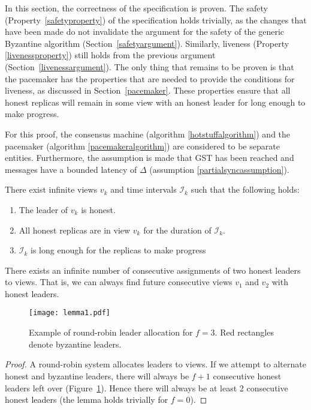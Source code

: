 In this section, the correctness of the specification is proven. The safety (Property~\ref{safetyproperty}) of the specification holds trivially, as the changes that have been made do not invalidate the argument for the safety of the generic Byzantine algorithm (Section~\ref{safetyargument}). Similarly, liveness (Property \ref{livenessproperty}) still holds from the previous argument (Section~\ref{livenessargument}). The only thing that remains to be proven is that the pacemaker has the properties that are needed to provide the conditions for liveness, as discussed in Section~\ref{pacemaker}. These properties ensure that all honest replicas will remain in some view with an honest leader for long enough to make progress.

For this proof, the consensus machine (algorithm \ref{hotstuffalgorithm}) and the pacemaker (algorithm \ref{pacemakeralgorithm}) are considered to be separate entities. Furthermore, the assumption is made that GST has been reached and messages have a bounded latency of $\Delta$ (assumption \ref{partialsyncassumption}).

\begin{theorem} \label{viewsync}
	There exist infinite views $v_k$ and time intervals $\mathcal{I}_k$ such that the following holds:
	\begin{enumerate}
		\item The leader of $v_k$ is honest.
		\item All honest replicas are in view $v_k$ for the duration of $\mathcal{I}_k$.
		\item $\mathcal{I}_k$ is long enough for the replicas to make progress
	\end{enumerate}
\end{theorem}

\begin{lemma} \label{viewslemma}
	There exists an infinite number of consecutive assignments of two honest leaders to views. That is, we can always find future consecutive views $v_1$ and $v_2$ with honest leaders.
\end{lemma}

\begin{figure}[h!]
	\centering
	\texttt{[image: lemma1.pdf]}
	\caption{Example of round-robin leader allocation for $f = 3$. Red rectangles denote byzantine leaders.}
	\label{lemma1diagram}
\end{figure}

\begin{proof}
	A round-robin system allocates leaders to views. If we attempt to alternate honest and byzantine leaders, there will always be $f + 1$ consecutive honest leaders left over (Figure~\ref{lemma1diagram}). Hence there will always be at least 2 consecutive honest leaders (the lemma holds trivially for $f = 0$).
\end{proof}

